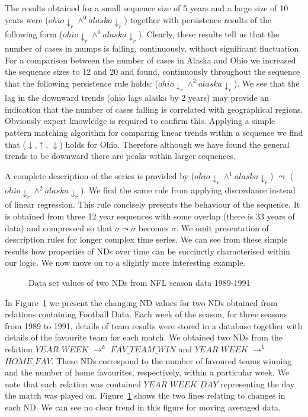 The results obtained for a small sequence size of 5 years and a large
size of 10 years were  ($ohio\downarrow_r \wedge^0 alaska\downarrow_r$)
together with persistence results of the following form 
($ohio\downarrow_r \wedge^0 alaska\downarrow_r$). Clearly, these results tell us
that the number of cases in mumps is falling, continuously, without
significant fluctuation. For a comparison between the
number of cases in Alaska and Ohio we increased the sequence sizes to
12 and 20 and found, continuously throughout the sequence that the
following persistence rule holds: 
($ohio\downarrow_r \wedge^2 alaska\downarrow_r$). We see that the lag in
the downward trends (ohio lags alaska by 2 years) may provide an
indication that the number of 
cases falling is correlated with geographical regions. Obviously
expert knowledge is required to confirm this. 
Applying a simple pattern matching algorithm for comparing linear
trends within a sequence we find that 
($\downarrow$,$\uparrow$, $\downarrow$) holds for Ohio. Therefore
although we have found the general trends to be downward there are
peaks within larger sequences.

\smallskip
A complete description of the series is provided by ($ohio\downarrow_r
\wedge^1 alaska\downarrow_r$) $\leadsto$ ($ohio\downarrow_r
\wedge^2 alaska\downarrow_r$). We find the same rule from applying
discordance instead of linear regression. This rule concisely presents
the behaviour of the sequence. It is obtained from three 12 year sequences
with some overlap (there is 33 years of data) and compressed so that $\sigma \leadsto \sigma$
becomes $\sigma$. We  
omit presentation of description rules for longer complex time series.
We can see from these simple results how properties of NDs over time
can be succinctly characterised within our logic. We now move on to a
slightly more interesting example.

\medskip



\begin{figure}
\centerline{}
\caption{\label{graph:profb_1}{Data set values of two NDs
from NFL season data 1989-1991}}
\end{figure}



In Figure~\ref{graph:profb_1} we present the changing ND values for
two NDs obtained from relations containing Football Data. Each week of
the season, for three seasons from 1989 to 1991, details of team
results were stored in a database together with details of the
favourite team for each match. We obtained two NDs from the relation
$YEAR$  $WEEK$ $\to^k$ $FAV\_TEAM\_WIN$ and $YEAR$  $WEEK$ $\to^k$
$HOME\_FAV$. These NDs correspond to the number of favoured teams
winning and the number of home favourites, respectively, within a
particular week.
We note that each relation was contained $YEAR$  $WEEK$
 $DAY$ representing the day the match was played
on. Figure~\ref{graph:profb_1} shows
the two lines relating to changes in each ND. We can see no clear
trend in this figure for moving averaged data.

